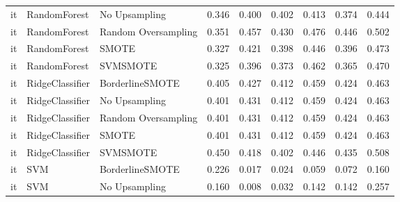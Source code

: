 \begin{tabular}{lllllllll}
      it &                 RandomForest &       No Upsampling & 0.346 &                     0.400 &                 0.402 &                  0.413 &                                   0.374 &     0.444 \\
      it &                 RandomForest & Random Oversampling & 0.351 &                     0.457 &                 0.430 &                  0.476 &                                   0.446 &     0.502 \\
      it &                 RandomForest &               SMOTE & 0.327 &                     0.421 &                 0.398 &                  0.446 &                                   0.396 &     0.473 \\
      it &                 RandomForest &            SVMSMOTE & 0.325 &                     0.396 &                 0.373 &                  0.462 &                                   0.365 &     0.470 \\
      it &              RidgeClassifier &     BorderlineSMOTE & 0.405 &                     0.427 &                 0.412 &                  0.459 &                                   0.424 &     0.463 \\
      it &              RidgeClassifier &       No Upsampling & 0.401 &                     0.431 &                 0.412 &                  0.459 &                                   0.424 &     0.463 \\
      it &              RidgeClassifier & Random Oversampling & 0.401 &                     0.431 &                 0.412 &                  0.459 &                                   0.424 &     0.463 \\
      it &              RidgeClassifier &               SMOTE & 0.401 &                     0.431 &                 0.412 &                  0.459 &                                   0.424 &     0.463 \\
      it &              RidgeClassifier &            SVMSMOTE & 0.450 &                     0.418 &                 0.402 &                  0.446 &                                   0.435 &     0.508 \\
      it &                          SVM &     BorderlineSMOTE & 0.226 &                     0.017 &                 0.024 &                  0.059 &                                   0.072 &     0.160 \\
      it &                          SVM &       No Upsampling & 0.160 &                     0.008 &                 0.032 &                  0.142 &                                   0.142 &     0.257 \\

\end{tabular}
